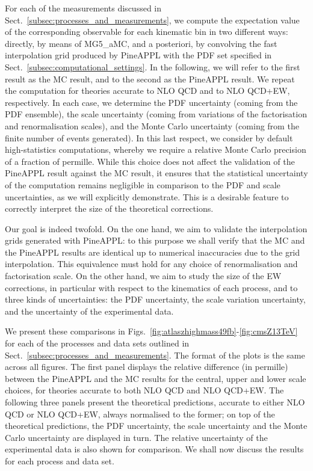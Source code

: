 For each of the measurements discussed in
Sect.~\ref{subsec:processes_and_measurements}, we compute the expectation
value of the corresponding observable for each kinematic bin in two different
ways: directly, by means of {\sc MG5\_aMC}, and a posteriori, by convolving the
fast interpolation grid produced by {\sc PineAPPL} with the PDF set specified
in Sect.~\ref{subsec:computational_settings}. In the following, we will refer
to the first result as the {\sc MC} result, and to the second as the
{\sc PineAPPL} result. We repeat the computation for theories accurate to NLO
QCD and to NLO QCD+EW, respectively. In each case, we determine the PDF
uncertainty (coming from the PDF ensemble), the scale uncertainty (coming from
variations of the factorisation and renormalisation scales), and the Monte
Carlo uncertainty (coming from the finite number of events generated). In this
last respect, we consider by default high-statistics computations, whereby we
require a relative Monte Carlo precision of a fraction of permille. While
this choice does not affect the validation of the {\sc PineAPPL} result against
the {\sc MC} result, it ensures that the statistical uncertainty of the
computation remains negligible in comparison to the PDF and scale uncertainties,
as we will explicitly demonstrate. This is a desirable feature to correctly
interpret the size of the theoretical corrections.

Our goal is indeed twofold. On the one hand, we aim to validate the
interpolation grids generated with {\sc PineAPPL}: to this purpose we shall
verify that the MC and the {\sc PineAPPL} results are identical up to numerical
inaccuracies due to the grid interpolation. This equivalence must hold for any
choice of renormalisation and factorisation scale. On the other hand, we aim to
study the size of the EW corrections, in particular with respect to the
kinematics of each process, and to three kinds of uncertainties: the PDF
uncertainty, the scale variation uncertainty, and the uncertainty of the
experimental data.

We present these comparisons in
Figs.~\ref{fig:atlaszhighmass49fb}-\ref{fig:cmsZ13TeV} for each of the processes
and data sets outlined in Sect.~\ref{subsec:processes_and_measurements}.
The format of the plots is the same across all figures. The first panel
displays the relative difference (in permille) between the {\sc PineAPPL} and
the {\sc MC} results for the central, upper and lower scale choices, for
theories accurate to both NLO QCD and NLO QCD+EW. The following three panels
present the theoretical predictions, accurate to either NLO QCD or NLO QCD+EW,
always normalised to the former; on top of the theoretical predictions, the
PDF uncertainty, the scale uncertainty and the Monte Carlo uncertainty are
displayed in turn. The relative uncertainty of the experimental data is
also shown for comparison. We shall now discuss the results for each
process and data set.


